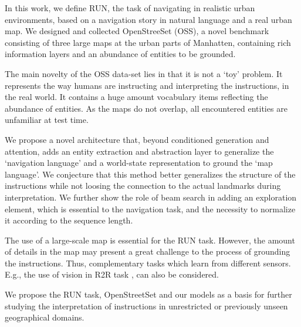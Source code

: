 \documentclass[11pt,a4paper]{article}
\begin{document}
In this work, we define RUN,  the task of navigating in  realistic urban environments, based on a navigation story in natural language and a real urban map.
%
We designed and collected  OpenStreeSet (OSS), a novel benchmark consisting of three large maps at the urban parts of Manhatten, containing rich information layers and an abundance of entities to be grounded.

The main novelty of the OSS data-set lies in that it is not a \enquote*{toy} problem. It represents the way humans are instructing and interpreting the instructions, in the real world. It  contains a huge amount vocabulary items reflecting the abundance of entities.
%
As the maps do not overlap,  all encountered entities are unfamiliar at test time. %
%



We propose a novel architecture that, beyond conditioned generation and attention,  adds an entity extraction and abstraction layer to generalize the \enquote*{navigation language} and a world-state representation to ground the \enquote*{map language}. We conjecture that this method better generalizes the structure of the instructions  while not loosing the connection to the actual landmarks during interpretation. We further show the role of beam search in adding an exploration element, which  is essential to the navigation task, and the necessity to normalize it according to the sequence length. 



The use of a large-scale map is essential for the RUN task. However, the amount of details in the map may present a great challenge to the process  of grounding the instructions.  Thus,  complementary tasks which learn from different sensors. E.g., the use of vision in R2R task \citep{anderson2017vision}, can also be considered.  
 
We propose  the RUN task, OpenStreetSet  and our models as a basis for further studying the interpretation of  instructions in unrestricted or previously unseen geographical domains.











\end{document}
